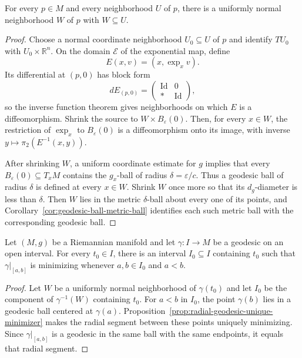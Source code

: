 \begin{lemma}
\label{lem:uniformly-normal-neighborhood}

For every $p\in M$ and every neighborhood $U$ of $p$, there is a uniformly
normal neighborhood $W$ of $p$ with $W\subseteq U$.
\end{lemma}

\begin{proof}
\sketch Choose a normal coordinate neighborhood $U_0\subseteq U$ of $p$ and
identify $TU_0$ with $U_0\times\mathbb R^n$. On the domain $\mathcal E$ of the
exponential map, define
\[
E(x,v)=(x,\exp_xv).
\]
Its differential at $(p,0)$ has block form
\[
dE_{(p,0)}=
\begin{pmatrix}
\operatorname{Id}&0\\
*&\operatorname{Id}
\end{pmatrix},
\]
so the inverse function theorem gives neighborhoods on which $E$ is a
diffeomorphism. Shrink the source to $W\times B_\varepsilon(0)$. Then, for
every $x\in W$, the restriction of $\exp_x$ to $B_\varepsilon(0)$ is a
diffeomorphism onto its image, with inverse
$y\mapsto\pi_2(E^{-1}(x,y))$.

After shrinking $W$, a uniform coordinate estimate for $g$ implies that every
$B_\varepsilon(0)\subseteq T_xM$ contains the $g_x$-ball of radius
$\delta=\varepsilon/c$. Thus a geodesic ball of radius $\delta$ is defined at
every $x\in W$. Shrink $W$ once more so that its $d_g$-diameter is less than
$\delta$. Then $W$ lies in the metric $\delta$-ball about every one of its
points, and Corollary~\ref{cor:geodesic-ball-metric-ball} identifies each such
metric ball with the corresponding geodesic ball.
\end{proof}

\begin{theorem}
\label{thm:locally-minimizing-geodesics}

Let $(M,g)$ be a Riemannian manifold and let $\gamma\colon I\to M$ be a
geodesic on an open interval. For every $t_0\in I$, there is an interval
$I_0\subseteq I$ containing $t_0$ such that $\gamma|_{[a,b]}$ is minimizing
whenever $a,b\in I_0$ and $a<b$.
\end{theorem}

\begin{proof}
\sketch Let $W$ be a uniformly normal neighborhood of $\gamma(t_0)$ and let
$I_0$ be the component of $\gamma^{-1}(W)$ containing $t_0$. For
$a<b$ in $I_0$, the point $\gamma(b)$ lies in a geodesic ball centered at
$\gamma(a)$. Proposition~\ref{prop:radial-geodesic-unique-minimizer} makes the
radial segment between these points uniquely minimizing. Since
$\gamma|_{[a,b]}$ is a geodesic in the same ball with the same endpoints, it
equals that radial segment.
\end{proof}

